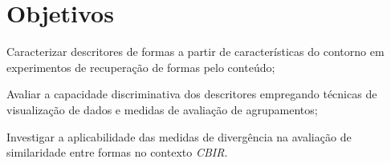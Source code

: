 


\section*{Objetivos}

\begin{alineas}
\item Caracterizar descritores de formas a partir de características do contorno em experimentos de recuperação de formas pelo conteúdo;

\item Avaliar a capacidade discriminativa dos descritores empregando técnicas de visualização de dados e medidas de avaliação de agrupamentos;  

\item Investigar a aplicabilidade das medidas de divergência na avaliação de similaridade entre formas no contexto \emph{CBIR}.
\end{alineas}

